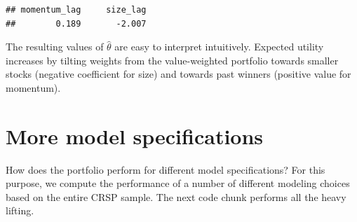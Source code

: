 \documentclass[
]{krantz}
\newenvironment{Shaded}{\begin{snugshade}}{\end{snugshade}}
\newcommand{\AttributeTok}[1]{\textcolor[rgb]{0.61,0.61,0.61}{#1}}
\newcommand{\ConstantTok}[1]{\textcolor[rgb]{0,0,0}{#1}}
\newcommand{\DecValTok}[1]{\textcolor[rgb]{0.06,0.06,0.06}{#1}}
\newcommand{\ErrorTok}[1]{\textcolor[rgb]{0.14,0.14,0.14}{\textbf{#1}}}
\newcommand{\FunctionTok}[1]{\textcolor[rgb]{0,0,0}{#1}}
\newcommand{\NormalTok}[1]{#1}
\newcommand{\OtherTok}[1]{\textcolor[rgb]{0.37,0.37,0.37}{#1}}
\newcommand{\SpecialCharTok}[1]{\textcolor[rgb]{0,0,0}{#1}}
\newcommand{\StringTok}[1]{\textcolor[rgb]{0.5,0.5,0.5}{#1}}
\begin{document}
\begin{verbatim}
## momentum_lag     size_lag 
##        0.189       -2.007
\end{verbatim}

The resulting values of \(\hat\theta\) are easy to interpret intuitively. Expected utility increases by tilting weights from the value-weighted portfolio towards smaller stocks (negative coefficient for size) and towards past winners (positive value for momentum).

\hypertarget{more-model-specifications}{%
\section{More model specifications}\label{more-model-specifications}}

How does the portfolio perform for different model specifications? For this purpose, we compute the performance of a number of different modeling choices based on the entire CRSP sample. The next code chunk performs all the heavy lifting.

\begin{Shaded}
\end{Shaded}
\end{document}
